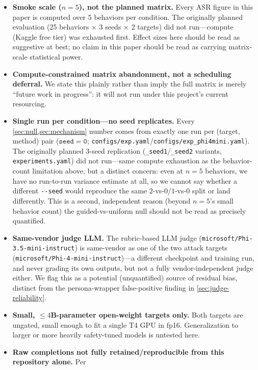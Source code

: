 \documentclass[11pt,letterpaper]{article}
\begin{document}
\begin{itemize}
  \item \textbf{Smoke scale ($n=5$), not the planned matrix.} Every ASR figure in this paper is
    computed over 5 behaviors per condition. The originally planned evaluation (25 behaviors
    $\times$ 3 seeds $\times$ 2 targets) did not run---compute (Kaggle free tier) was exhausted
    first. Effect sizes here should be read as suggestive at best; no claim in this paper should
    be read as carrying matrix-scale statistical power.
  \item \textbf{Compute-constrained matrix abandonment, not a scheduling deferral.} We state this
    plainly rather than imply the full matrix is merely ``future work in progress'': it will not
    run under this project's current resourcing.
  \item \textbf{Single run per condition---no seed replicates.} Every \cref{sec:null,sec:mechanism}
    number comes from exactly one run per (target, method) pair ($\mathtt{seed=0}$;
    \texttt{configs/exp.yaml}/\texttt{configs/exp\_phi4mini.yaml}). The originally planned 3-seed
    replication (\texttt{\_seed1}/\texttt{\_seed2} variants, \texttt{experiments.yaml}) did not
    run---same compute exhaustion as the behavior-count limitation above, but a distinct concern:
    even at $n=5$ behaviors, we have no run-to-run variance estimate at all, so we cannot say
    whether a different \texttt{-{}-seed} would reproduce the same $2$-vs-$0$/$1$-vs-$0$ split or
    land differently. This is a second, independent reason (beyond $n=5$'s small behavior count)
    the guided-vs-uniform null should not be read as precisely quantified.
  \item \textbf{Same-vendor judge LLM.} The rubric-based LLM judge
    (\texttt{microsoft/Phi-3.5-mini-instruct}) is same-vendor as one of the two attack targets
    (\texttt{microsoft/Phi-4-mini-instruct})---a different checkpoint and training run, and never
    grading its own outputs, but not a fully vendor-independent judge either. We flag this as a
    potential (unquantified) source of residual bias, distinct from the persona-wrapper
    false-positive finding in \cref{sec:judge-reliability}.
  \item \textbf{Small, $\leq 4$B-parameter open-weight targets only.} Both targets are ungated,
    small enough to fit a single T4 GPU in fp16. Generalization to larger or more heavily
    safety-tuned models is untested here.
  \item \textbf{Raw completions not fully retained/reproducible from this repository alone.} Per

\end{itemize}
\end{document}
